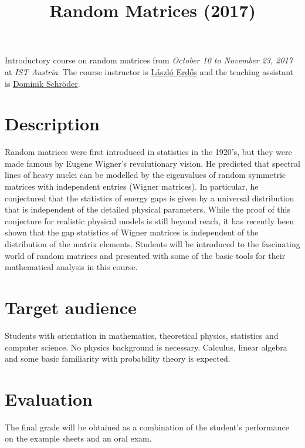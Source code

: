 \documentclass[a4paper]{article}
\begin{document}
\title{Random Matrices (2017)%
  \label{random-matrices-2017}}
\author{}
\date{}
\maketitle

Introductory course on random matrices from \emph{October 10 to November 23, 2017} at \emph{IST Austria}. The course instructor is \href{http://ist.ac.at/en/research/research-groups/erdoes-group/}{László Erdős} and the teaching assistant is \href{http://ist.ac.at/~dschroed/}{Dominik Schröder}.


\section{Description%
  \label{description}%
}

Random matrices were first introduced in statistics in the 1920's, but they were made famous by Eugene Wigner's revolutionary vision. He predicted that spectral lines of heavy nuclei can be modelled by the eigenvalues of random symmetric matrices with independent entries (Wigner matrices). In particular, he conjectured that the statistics of energy gaps is given by a universal distribution that is independent of the detailed physical parameters. While the proof of this conjecture for realistic physical models is still beyond reach, it has recently been shown that the gap statistics of Wigner matrices is independent of the distribution of the matrix elements. Students will be introduced to the fascinating world of random matrices and presented with some of the basic tools for their mathematical analysis in this course.


\section{Target audience%
  \label{target-audience}%
}

Students with orientation in mathematics, theoretical physics, statistics and computer science. No physics background is necessary. Calculus, linear algebra and some basic familiarity with probability theory is expected.


\section{Evaluation%
  \label{evaluation}%
}

The final grade will be obtained as a combination of the student's performance on the example sheets and an oral exam.
\end{document}
